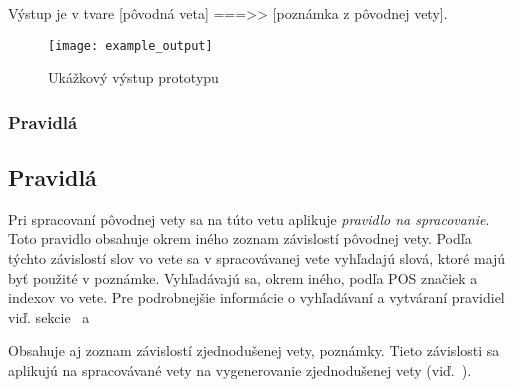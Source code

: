 Výstup je v tvare [pôvodná veta] ===>> [poznámka z pôvodnej vety].

\begin{figure}[H]
	\begin{center}\texttt{[image: example\_output]}\end{center}
	\caption[Ukážkový výstup prototypu]{Ukážkový výstup prototypu}\label{fig:example_output}
\end{figure}

%
%
{
	\subsubsection{Pravidlá}
}
{
	\subsection{Pravidlá}
}
\label{subsubsec:notenizer_pravidla}
Pri spracovaní pôvodnej vety sa na túto vetu aplikuje \textit{pravidlo na spracovanie}. Toto pravidlo obsahuje okrem iného zoznam závislostí pôvodnej vety. Podľa týchto závislostí slov vo vete sa v spracovávanej vete vyhľadajú slová, ktoré majú byť použité v poznámke. Vyhľadávajú sa, okrem iného, podľa POS značiek a indexov vo vete. Pre podrobnejšie informácie o vyhľadávaní a vytváraní pravidiel viď. sekcie~ a~

Obsahuje aj zoznam závislostí zjednodušenej vety, poznámky. Tieto závislosti sa aplikujú na spracovávané vety na vygenerovanie zjednodušenej vety (viď.~).